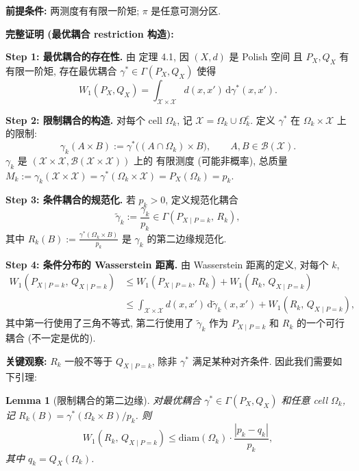 \documentclass[12pt,a4paper]{article}
\newtheorem{lemma}[theorem]{Lemma}
\newcommand{\cX}{\mathcal{X}}
\newcommand{\diam}{\mathrm{diam}}
\newcommand{\premise}{\textbf{前提条件: }}
\begin{document}
\premise 两测度有有限一阶矩; $\pi$ 是任意可测分区.

\medskip\noindent
\textbf{完整证明 (最优耦合 restriction 构造):}

\textbf{Step 1: 最优耦合的存在性.}
由 \citet{villani2008optimal} 定理 4.1, 因 $(X,d)$ 是 Polish 空间
且 $P_X,Q_X$ 有有限一阶矩, 存在最优耦合
$\gamma^*\in\Gamma(P_X,Q_X)$ 使得
\begin{equation}\label{eq:optimal-coupling}
    W_1(P_X,Q_X) = \int_{\cX\times\cX} d(x,x')\,\mathrm{d}\gamma^*(x,x').
\end{equation}

\textbf{Step 2: 限制耦合的构造.}
对每个 cell $\Omega_k$, 记 $\cX=\Omega_k\cup\Omega_k^c$.
定义 $\gamma^*$ 在 $\Omega_k\times\cX$ 上的限制:
\begin{equation}\label{eq:restriction}
    \gamma_k(A\times B) := \gamma^*\bigl((A\cap\Omega_k)\times B\bigr),
    \qquad A,B\in\mathcal{B}(\cX).
\end{equation}
$\gamma_k$ 是 $(\cX\times\cX,\mathcal{B}(\cX\times\cX))$ 上的
有限测度 (可能非概率), 总质量 $M_k:=\gamma_k(\cX\times\cX)
= \gamma^*(\Omega_k\times\cX)=P_X(\Omega_k)=p_k$.

\textbf{Step 3: 条件耦合的规范化.}
若 $p_k>0$, 定义规范化耦合
\begin{equation}\label{eq:normalized}
    \tilde{\gamma}_k := \frac{\gamma_k}{p_k}\in\Gamma(P_{X\mid P=k},\,R_k),
\end{equation}
其中 $R_k(B) := \frac{\gamma^*(\Omega_k\times B)}{p_k}$
是 $\gamma_k$ 的第二边缘规范化.

\textbf{Step 4: 条件分布的 Wasserstein 距离.}
由 Wasserstein 距离的定义, 对每个 $k$,
\begin{align*}
    W_1(P_{X\mid P=k},\,Q_{X\mid P=k})
    &\leq W_1(P_{X\mid P=k},\,R_k) + W_1(R_k,\,Q_{X\mid P=k}) \\
    &\leq \int_{\cX\times\cX} d(x,x')\,\mathrm{d}\tilde{\gamma}_k(x,x')
        + W_1(R_k,\,Q_{X\mid P=k}),
\end{align*}
其中第一行使用了三角不等式, 第二行使用了 $\tilde{\gamma}_k$
作为 $P_{X\mid P=k}$ 和 $R_k$ 的一个可行耦合 (不一定是优的).

\textbf{关键观察:} $R_k$ 一般不等于 $Q_{X\mid P=k}$,
除非 $\gamma^*$ 满足某种对齐条件. 因此我们需要如下引理:

\begin{lemma}[限制耦合的第二边缘]\label{lem:second-marginal}
对最优耦合 $\gamma^*\in\Gamma(P_X,Q_X)$ 和任意 cell $\Omega_k$,
记 $R_k(B)=\gamma^*(\Omega_k\times B)/p_k$. 则
\begin{equation}\label{eq:second-marginal-bound}
    W_1(R_k,\,Q_{X\mid P=k}) \leq \diam(\Omega_k)\cdot
    \frac{|p_k - q_k|}{p_k},
\end{equation}
其中 $q_k = Q_X(\Omega_k)$.
\end{lemma}
\end{document}
